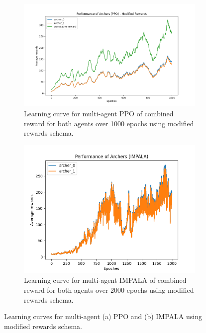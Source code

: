 \documentclass[12pt,a4paper, onecolumn]{exam}
\begin{document}
\begin{figure}[H]
    \centering
    \begin{subfigure}[b]{0.49\textwidth}
        \centering
        \includegraphics[width=\linewidth]{figures_latex/learning_trajectory_multi_ppo.png}
        \caption{Learning curve for multi-agent PPO of combined reward for both agents over 1000 epochs using modified rewards schema.}
        \label{fig:sfiglbshk25}
    \end{subfigure}
    \hfill
    \begin{subfigure}[b]{0.49\textwidth}
        \centering
        \includegraphics[width=\linewidth]{figures_latex/lt_multi_impala_best_mod_rewards.png}
        \caption{Learning curve for multi-agent IMPALA of combined reward for both agents over 2000 epochs using modified rewards schema.}
        \label{fig:sfiglbshk26}
    \end{subfigure}
    \caption{Learning curves for multi-agent (a) PPO and (b) IMPALA using modified rewards schema.}
    \label{fig:multi_agent_learning_curves}
\end{figure}
\end{document}

